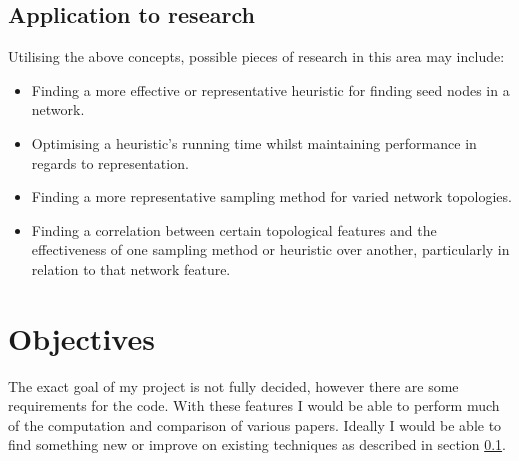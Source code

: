 \documentclass{article}
\begin{document}
\subsection{Application to research} \label{implementation}
Utilising the above concepts, possible pieces of research in this area may include:
\begin{itemize}
	\item Finding a more effective or representative heuristic for finding seed nodes in a network.
	\item Optimising a heuristic's running time whilst maintaining performance in regards to representation.
	\item Finding a more representative sampling method for varied network topologies.
	\item Finding a correlation between certain topological features and the effectiveness of one sampling method or heuristic over another, particularly in relation to that network feature.
\end{itemize}

\section{Objectives}

The exact goal of my project is not fully decided, however there are some requirements for the code.
With these features I would be able to perform much of the computation and comparison of various papers.
Ideally I would be able to find something new or improve on existing techniques as described in section \ref{implementation}.
\end{document}
